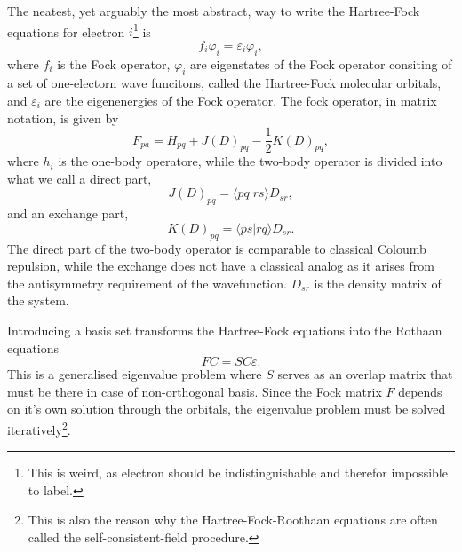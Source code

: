\documentclass[
    a4paper, aps, twocolumn, floatfix, superscriptaddress,
    nofootinbib]{revtex4-1}
\newcommand{\1}{\mathds{1}}
\newcommand{\braket}[2]{\langle #1 \vert #2 \rangle}
\begin{document}

            The neatest, yet arguably the most abstract, way to write the Hartree-Fock
            equations for electron $i$\footnote{This is weird, as electron
            should be indistinguishable and therefor impossible to label.} is
            \begin{equation}
                f_i \varphi_i = \varepsilon_i \varphi_i,
            \end{equation}
            where $f_i$ is the Fock operator, $\varphi_i$ are eigenstates of the Fock
            operator consiting of a set of one-electorn wave funcitons, called the
            Hartree-Fock molecular orbitals, and $\varepsilon_i$ are the eigenenergies
            of the Fock operator. The fock operator, in matrix notation, is given by
            \begin{equation}
                F_{pa} = H_{pq} +  J(D)_{pq} - \frac{1}{2}K(D)_{pq},
            \end{equation}
            where $h_i$ is the one-body operatore, while the two-body operator is
            divided into what we call a direct part,
            \begin{equation}
                J(D)_{pq} = \braket{pq}{rs}D_{sr},
            \end{equation}
            and an exchange part,
            \begin{equation}
                K(D)_{pq} = \braket{ps}{rq}D_{sr}.
            \end{equation}
            The direct part of the two-body operator is comparable to classical Coloumb
            repulsion, while the exchange does not have a classical analog as it arises
            from the antisymmetry requirement of the wavefunction. $D_{sr}$ is the
            density matrix of the system.

            Introducing a basis set transforms the Hartree-Fock equations into the Rothaan
            equations
            \begin{equation}
                FC = SC\varepsilon.
            \end{equation}
            This is a generalised eigenvalue problem where $S$ serves as an overlap matrix
            that must be there in case of non-orthogonal basis. Since the Fock matrix $F$
            depends on it's own solution through the orbitals, the eigenvalue problem must
            be solved iteratively\footnote{This is also the reason why the
            Hartree-Fock-Roothaan equations are often called the self-consistent-field
            procedure.}.
\end{document}
